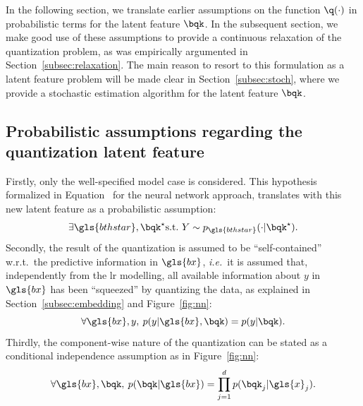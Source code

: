 
In the following section, we translate earlier assumptions on the function $\q(\cdot)$ in probabilistic terms for the latent feature $\bqk$. In the subsequent section, we make good use of these assumptions to provide a continuous relaxation of the quantization problem, as was empirically argumented in Section~\ref{subsec:relaxation}.
The main reason to resort to this formulation as a latent feature problem will be made clear in Section~\ref{subsec:stoch}, where we provide a stochastic estimation algorithm for the latent feature $\bqk$.

\subsection{Probabilistic assumptions regarding the quantization latent feature}

Firstly, only the well-specified model case is considered. This hypothesis formalized in Equation~ for the neural network approach, translates with this new latent feature as a probabilistic assumption:
\begin{equation} \label{hyp:true}
\exists \gls{bthstar}, \bqk^\star \text{s.t.\ } Y \sim p_{\gls{bthstar}}(\cdot | \bqk^\star).
\end{equation}
Secondly, the result of the quantization is assumed to be ``self-contained'' w.r.t.\ the predictive information in $\gls{bx}$, \textit{i.e.}\ it is assumed that, independently from the \gls{lr} modelling, all available information about $y$ in $\gls{bx}$ has been ``squeezed'' by quantizing the data, as explained in Section~\ref{subsec:embedding} and Figure~\ref{fig:nn}:
\begin{equation} \label{hyp:squeeze}
\forall \gls{bx},y,\: p(y|\gls{bx},\bqk) = p(y|\bqk).
\end{equation}
Thirdly, the component-wise nature of the quantization can be stated as a conditional independence assumption as in Figure~\ref{fig:nn}:
\begin{equation} \label{hyp:component}
\forall \gls{bx},\bqk,\: p(\bqk|\gls{bx}) = \prod_{j=1}^d p(\bqk_j | \gls{x}_j).
\end{equation}


